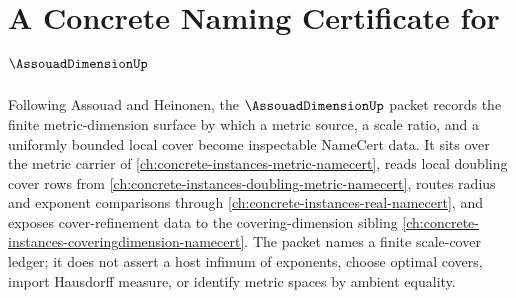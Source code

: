 \chapter{A Concrete Naming Certificate for $\AssouadDimensionUp$}
\label{ch:concrete-instances-assouad-dimension-namecert}

Following Assouad and Heinonen, the $\AssouadDimensionUp$ packet records the finite metric-dimension surface by which a metric source, a scale ratio, and a uniformly bounded local cover become inspectable NameCert data. It sits over the metric carrier of \autoref{ch:concrete-instances-metric-namecert}, reads local doubling cover rows from \autoref{ch:concrete-instances-doubling-metric-namecert}, routes radius and exponent comparisons through \autoref{ch:concrete-instances-real-namecert}, and exposes cover-refinement data to the covering-dimension sibling \autoref{ch:concrete-instances-coveringdimension-namecert}. The packet names a finite scale-cover ledger; it does not assert a host infimum of exponents, choose optimal covers, import Hausdorff measure, or identify metric spaces by ambient equality.

